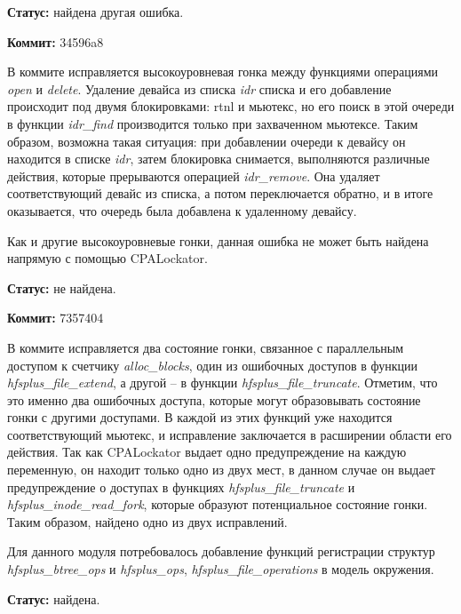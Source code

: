 \textbf{Статус:} найдена другая ошибка.

\vspace{1cm}

\textbf{Коммит:} 34596a8

В коммите исправляется высокоуровневая гонка между функциями операциями \textit{open} и \textit{delete}.
Удаление девайса из списка \textit{idr} списка и его добавление происходит под двумя блокировками: rtnl и мьютекс, но его поиск  в этой очереди в функции \textit{idr\_find} производится только при захваченном мьютексе.
Таким образом, возможна такая ситуация: при добавлении очереди к девайсу он находится в списке \textit{idr}, затем блокировка снимается, выполняются различные действия, которые прерываются операцией \textit{idr\_remove}. 
Она удаляет соответствующий девайс из списка, а потом переключается обратно, и в итоге оказывается, что очередь была добавлена к удаленному девайсу.

Как и другие высокоуровневые гонки, данная ошибка не может быть найдена напрямую с помощью CPALockator.

\textbf{Статус:} не найдена.

\vspace{1cm}

\textbf{Коммит:} 7357404

В коммите исправляется два состояние гонки, связанное с параллельным доступом к счетчику \textit{alloc\_blocks}, один из ошибочных доступов в функции \textit{hfsplus\_file\_extend}, а другой -- в функции \textit{hfsplus\_file\_truncate}.
Отметим, что это именно два ошибочных доступа, которые могут образовывать состояние гонки с другими доступами.
В каждой из этих функций уже находится соответствующий мьютекс, и исправление заключается в расширении области его действия.
Так как CPALockator выдает одно предупреждение на каждую переменную, он находит только одно из двух мест, в данном случае он выдает предупреждение о доступах в функциях \textit{hfsplus\_file\_truncate} и \textit{hfsplus\_inode\_read\_fork}, которые образуют потенциальное состояние гонки.
Таким образом, найдено одно из двух исправлений.

Для данного модуля потребовалось добавление функций регистрации структур \textit{hfsplus\_btree\_ops} и \textit{hfsplus\_ops}, \textit{hfsplus\_file\_operations} в модель окружения.

\textbf{Статус:} найдена.

\vspace{1cm}

